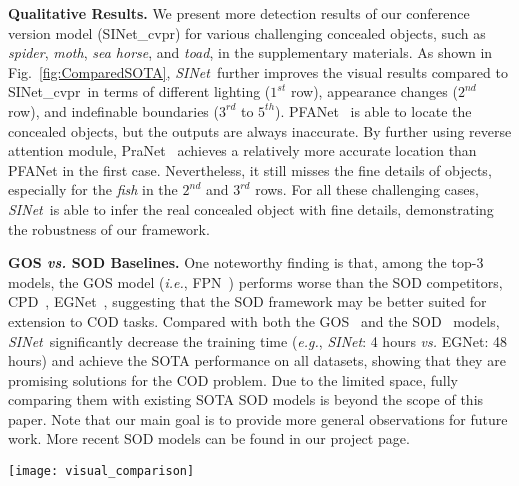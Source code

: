 \documentclass[10pt,journal,compsoc]{IEEEtran}
\def\ie{\emph{i.e.}}
\def\eg{\emph{e.g.}}
\newcommand{\myPara}[1]{\vspace{6pt}\noindent\textbf{#1}\qquad }
\newcommand{\figref}[1]{Fig.~\ref{#1}}
\newcommand{\supp}[1]{#1}
\def\ournewmodel{\emph{SINet}}
\begin{document}
\myPara{Qualitative Results.}
We present more detection results of our conference version model (SINet\_cvpr) 
for various challenging concealed objects, such as \emph{spider}, \emph{moth}, 
\emph{sea horse}, and \emph{toad}, in the \supp{supplementary materials}.
%
As shown in \figref{fig:ComparedSOTA}, \ournewmodel~further improves the visual 
results compared to SINet\_cvpr~in terms of different lighting ($1^{st}$ row), 
appearance changes ($2^{nd}$ row), 
and indefinable boundaries ($3^{rd}$ to $5^{th}$).  
%
PFANet~\cite{zhao2019pyramid} is able to locate the concealed objects, 
but the outputs are always inaccurate.
%
By further using reverse attention module, PraNet~\cite{fan2020pranet} 
achieves a relatively more accurate location than PFANet in the first case. 
Nevertheless, it still misses the fine details of objects,
especially for the \emph{fish} in the $2^{nd}$ and $3^{rd}$ rows.
%
For all these challenging cases, \ournewmodel~is able to
infer the real concealed object with fine details, 
demonstrating the robustness of our framework.


\myPara{GOS \textit{vs.} SOD Baselines.}
One noteworthy finding is that, among the top-3 models, 
the GOS model (\ie, FPN~\cite{lin2017feature})
performs worse than the SOD competitors, CPD~\cite{wu2019cascaded}, 
EGNet~\cite{zhao2019EGNet},
suggesting that the SOD framework may be better suited for extension to COD tasks.
%
Compared with both the GOS~\cite{lin2017feature,he2017mask,zhao2017pyramid,
zou2018DLMIA,huang2019mask,chen2019hybrid} 
and the SOD~\cite{liu2018picanet,zhao2019pyramid,wu2019cascaded,zhao2019EGNet}
models, \ournewmodel~significantly decrease the training time
(\eg, \ournewmodel: 4 hours \textit{vs.} EGNet: 48 hours) and 
achieve the SOTA performance on all datasets, 
showing that they are promising solutions for the COD problem. 
Due to the limited space, fully comparing them with existing SOTA SOD models 
is beyond the scope of this paper. 
Note that our main goal is to provide more general observations for 
future work. 
More recent SOD models can be found in our project page.

\begin{figure*}[t!]
  \centering
  \texttt{[image: visual\_comparison]}
  \vspace*{-15pt}
  \caption{\textbf{Comparison of our \ournewmodel~and 
    three top-performing baselines}, 
    including (d) SINet\_cvpr~\cite{fan2020camouflaged}, 
    (e) PraNet~\cite{fan2020pranet}, and (f) PFANet~\cite{zhao2019pyramid}.
  }\label{fig:ComparedSOTA}
\end{figure*}
\end{document}
